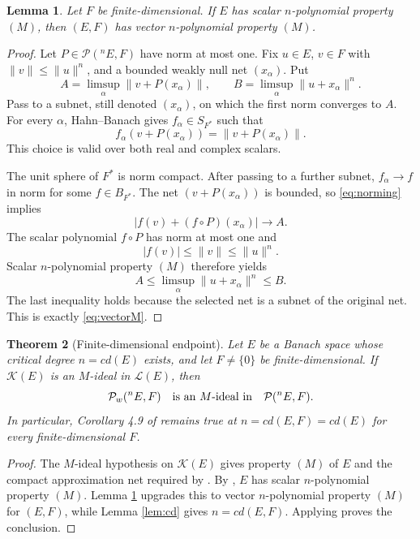 \documentclass[11pt]{article}
\newtheorem{theorem}{Theorem}
\newtheorem{lemma}[theorem]{Lemma}
\newcommand{\K}{\mathcal K}
\newcommand{\Lop}{\mathcal L}
\newcommand{\Pw}{\mathcal P_w}
\newcommand{\Poly}{\mathcal P}
\begin{document}
\begin{lemma}\label{lem:lift}
Let \(F\) be finite-dimensional. If \(E\) has scalar
\(n\)-polynomial property \((M)\), then \((E,F)\) has vector
\(n\)-polynomial property \((M)\).
\end{lemma}

\begin{proof}
Let \(P\in\Poly(^nE,F)\) have norm at most one. Fix \(u\in E\),
\(v\in F\) with \(\|v\|\le\|u\|^n\), and a bounded weakly null net
\((x_\alpha)\). Put
\[
 A=\limsup_\alpha\|v+P(x_\alpha)\|,\qquad
 B=\limsup_\alpha\|u+x_\alpha\|^n.
\]
Pass to a subnet, still denoted \((x_\alpha)\), on which the first
norm converges to \(A\). For every \(\alpha\), Hahn--Banach gives
\(f_\alpha\in S_{F^*}\) such that
\[
 f_\alpha(v+P(x_\alpha))=\|v+P(x_\alpha)\|.
 \tag{2}\label{eq:norming}
\]
This choice is valid over both real and complex scalars.

The unit sphere of \(F^*\) is norm compact. After passing to a further
subnet, \(f_\alpha\to f\) in norm for some \(f\in B_{F^*}\). The net
\((v+P(x_\alpha))\) is bounded, so \eqref{eq:norming} implies
\[
 |f(v)+(f\circ P)(x_\alpha)|\longrightarrow A.
\]
The scalar polynomial \(f\circ P\) has norm at most one and
\[
 |f(v)|\le\|v\|\le\|u\|^n.
\]
Scalar \(n\)-polynomial property \((M)\) therefore yields
\[
 A
 \le \limsup_\alpha\|u+x_\alpha\|^n
 \le B.
\]
The last inequality holds because the selected net is a subnet of the
original net. This is exactly \eqref{eq:vectorM}.
\end{proof}

\begin{theorem}[Finite-dimensional endpoint]\label{thm:main}
Let \(E\) be a Banach space whose critical degree \(n=cd(E)\) exists,
and let \(F\ne\{0\}\) be finite-dimensional. If \(\K(E)\) is an
\(M\)-ideal in \(\Lop(E)\), then
\[
 \Pw(^nE,F)\quad\hbox{is an \(M\)-ideal in}\quad\Poly(^nE,F).
\]
In particular, Corollary 4.9 of \cite{DL} remains true at
\(n=cd(E,F)=cd(E)\) for every finite-dimensional \(F\).
\end{theorem}

\begin{proof}
The \(M\)-ideal hypothesis on \(\K(E)\) gives property \((M)\) of \(E\)
and the compact approximation net required by \cite[Theorem 4.7]{DL}.
By \cite[Proposition 3.10]{D}, \(E\) has scalar \(n\)-polynomial
property \((M)\). Lemma \ref{lem:lift} upgrades this to vector
\(n\)-polynomial property \((M)\) for \((E,F)\), while Lemma
\ref{lem:cd} gives \(n=cd(E,F)\). Applying \cite[Theorem 4.7]{DL}
proves the conclusion.
\end{proof}
\end{document}
